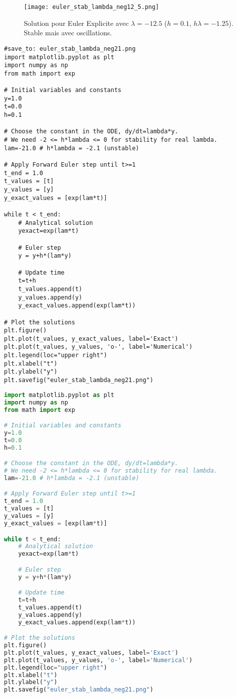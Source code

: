 \documentclass{article}
\begin{document}
\begin{figure}[H]
\centering
\texttt{[image: euler\_stab\_lambda\_neg12\_5.png]}
\caption{Solution pour Euler Explicite avec $\lambda=-12.5$ ($h=0.1$, $h\lambda=-1.25$). Stable mais avec oscillations.}
\label{fig:euler_stab_neg12_5}
\end{figure}

\begin{verbatim}
#save_to: euler_stab_lambda_neg21.png
import matplotlib.pyplot as plt
import numpy as np
from math import exp

# Initial variables and constants
y=1.0
t=0.0
h=0.1

# Choose the constant in the ODE, dy/dt=lambda*y.
# We need -2 <= h*lambda <= 0 for stability for real lambda.
lam=-21.0 # h*lambda = -2.1 (unstable)

# Apply Forward Euler step until t>=1
t_end = 1.0
t_values = [t]
y_values = [y]
y_exact_values = [exp(lam*t)]

while t < t_end:
    # Analytical solution
    yexact=exp(lam*t)

    # Euler step
    y = y+h*(lam*y)

    # Update time
    t=t+h
    t_values.append(t)
    y_values.append(y)
    y_exact_values.append(exp(lam*t))

# Plot the solutions
plt.figure()
plt.plot(t_values, y_exact_values, label='Exact')
plt.plot(t_values, y_values, 'o-', label='Numerical')
plt.legend(loc="upper right")
plt.xlabel("t")
plt.ylabel("y")
plt.savefig("euler_stab_lambda_neg21.png")
\end{verbatim}
\begin{lstlisting}[language=Python, caption=Code Python pour Euler Explicite instable, label=code:euler_stab_neg21]
import matplotlib.pyplot as plt
import numpy as np
from math import exp

# Initial variables and constants
y=1.0
t=0.0
h=0.1

# Choose the constant in the ODE, dy/dt=lambda*y.
# We need -2 <= h*lambda <= 0 for stability for real lambda.
lam=-21.0 # h*lambda = -2.1 (unstable)

# Apply Forward Euler step until t>=1
t_end = 1.0
t_values = [t]
y_values = [y]
y_exact_values = [exp(lam*t)]

while t < t_end:
    # Analytical solution
    yexact=exp(lam*t)

    # Euler step
    y = y+h*(lam*y)

    # Update time
    t=t+h
    t_values.append(t)
    y_values.append(y)
    y_exact_values.append(exp(lam*t))

# Plot the solutions
plt.figure()
plt.plot(t_values, y_exact_values, label='Exact')
plt.plot(t_values, y_values, 'o-', label='Numerical')
plt.legend(loc="upper right")
plt.xlabel("t")
plt.ylabel("y")
plt.savefig("euler_stab_lambda_neg21.png")
\end{lstlisting}
\end{document}

